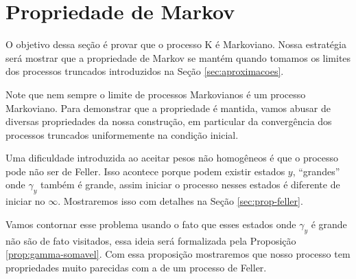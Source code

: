 
\section{Propriedade de Markov}
\label{sec:prop-markov}

O objetivo dessa seção é provar que o processo K é Markoviano. Nossa
estratégia será mostrar que a propriedade de Markov se mantém quando
tomamos os limites dos processos truncados introduzidos na Seção
\ref{sec:aproximacoes}.

Note que nem sempre o limite de processos Markovianos é um processo
Markoviano. Para demonstrar que a propriedade é mantida, vamos abusar
de diversas propriedades da nossa construção, em particular da
convergência dos processos truncados uniformemente na condição
inicial.

Uma dificuldade introduzida ao aceitar pesos não homogêneos é que o
processo pode não ser de Feller. Isso acontece porque podem existir
estados $y$, ``grandes'' onde $\gamma_y$ também é grande, assim
iniciar o processo nesses estados é diferente de iniciar no
$\infty$. Mostraremos isso com detalhes na Seção
\ref{sec:prop-feller}.

Vamos contornar esse problema usando o fato que esses estados onde
$\gamma_y$ é grande não são de fato visitados, essa ideia será
formalizada pela Proposição \ref{prop:gamma-somavel}. Com essa
proposição mostraremos que nosso processo tem propriedades muito
parecidas com a de um processo de Feller.

